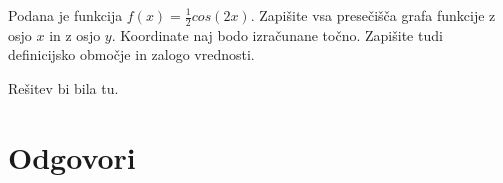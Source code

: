 \begin{vaja}
  Podana je funkcija $f(x) = \frac{1}{2} cos(2x)$. Zapišite vsa presečišča grafa funkcije z osjo $x$ in z osjo $y$. Koordinate naj bodo izračunane točno. Zapišite tudi definicijsko območje in zalogo vrednosti. 

  \begin{odgovor}
    Rešitev bi bila tu.
  \end{odgovor}
\end{vaja}




\section{Odgovori}
\label{sec:sincos-odgovori}




